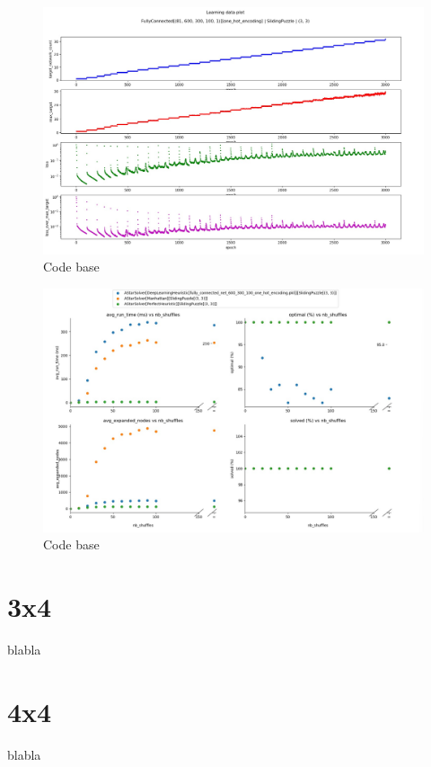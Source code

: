 \begin{landscape}
\begin{figure}[H]
\centering
\includegraphics[scale=0.5]{./Figures/33SPDeepReinforcementLearning.jpeg}
\caption[Codebase]{Code base}
\label{fig:Codebase}
\end{figure}
\end{landscape}


\begin{landscape}
\begin{figure}[H]
\centering
\includegraphics[scale=0.5]{./Figures/33SPPerformance.jpeg}
\caption[Codebase]{Code base}
\label{fig:Codebase}
\end{figure}
\end{landscape}


\section{3x4}

blabla


\section{4x4}

blabla
